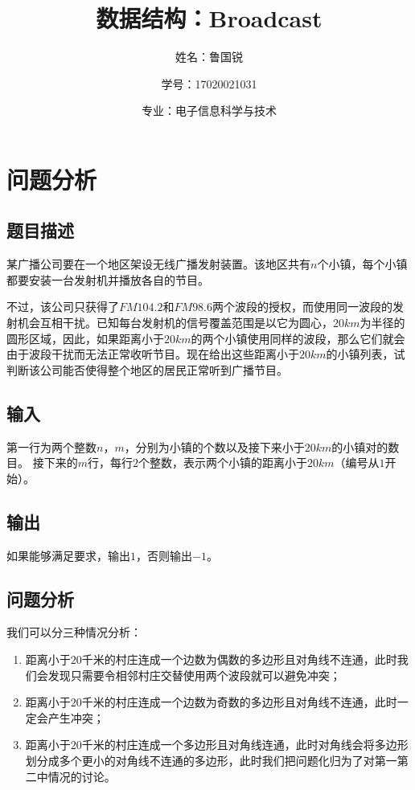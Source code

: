 \documentclass[UTF8]{ctexart}
\title{数据结构：Broadcast}
\author{姓名：鲁国锐 \protect\newline
\and 学号：17020021031 \\
\and 专业：电子信息科学与技术}
\begin{document}
	\maketitle
	\renewcommand{\contentsname}{Contents}
	\tableofcontents
	\newpage
	
	\hypersetup{
	bookmarks=true,
	colorlinks=true,
	linkcolor=red,
	urlcolor=blue
	}
	\section{问题分析}
	\subsection{题目描述}
	\indent 某广播公司要在一个地区架设无线广播发射装置。该地区共有$n$个小镇，每个小镇都要安装一台发射机并播放各自的节目。

	\indent 不过，该公司只获得了$FM104.2$和$FM98.6$两个波段的授权，而使用同一波段的发射机会互相干扰。已知每台发射机的信号覆盖范围是以它为圆心，$20km$为半径的圆形区域，因此，如果距离小于$20km$的两个小镇使用同样的波段，那么它们就会由于波段干扰而无法正常收听节目。现在给出这些距离小于$20km$的小镇列表，试判断该公司能否使得整个地区的居民正常听到广播节目。

     \subsection{输入}
     \indent 第一行为两个整数$n$，$m$，分别为小镇的个数以及接下来小于$20km$的小镇对的数目。 接下来的$m$行，每行$2$个整数，表示两个小镇的距离小于$20km$（编号从$1$开始）。
     
     \subsection{输出}
     \indent 如果能够满足要求，输出$1$，否则输出$-1$。

	\subsection{问题分析}\label{analysis}
	\indent 我们可以分三种情况分析：
	\begin{enumerate}[leftmargin=50pt]
	\item 距离小于$20$千米的村庄连成一个边数为偶数的多边形且对角线不连通，此时我们会发现只需要令相邻村庄交替使用两个波段就可以避免冲突；
	\item 距离小于$20$千米的村庄连成一个边数为奇数的多边形且对角线不连通，此时一定会产生冲突；
	\item 距离小于$20$千米的村庄连成一个多边形且对角线连通，此时对角线会将多边形划分成多个更小的对角线不连通的多边形，此时我们把问题化归为了对第一第二中情况的讨论。
	\end{enumerate}
	
\end{document}
